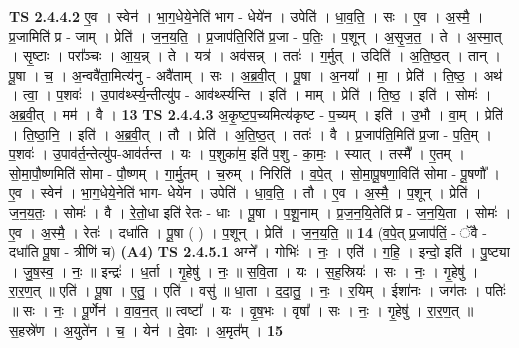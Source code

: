 \documentclass[17pt]{extarticle}
\begin{document}
                  \newline
                                \textbf{ TS 2.4.4.2} \newline
                  ए॒व । स्वेन॑ । भा॒ग॒धेये॒नेति॑ भाग - धेये॑न । उपेति॑ । धा॒व॒ति॒ । सः । ए॒व । अ॒स्मै॒ । प्र॒जामिति॑ प्र - जाम् । प्रेति॑ । ज॒न॒य॒ति॒ । प्र॒जाप॑ति॒रिति॑ प्र॒जा - प॒तिः॒ । प॒शून् । अ॒सृ॒ज॒त॒ । ते । अ॒स्मा॒त् । सृ॒ष्टाः । परा᳚ञ्चः । आ॒य॒न्न् । ते । यत्र॑ । अव॑सन्न् । ततः॑ । ग॒र्मुत् । उदिति॑ । अ॒ति॒ष्ठ॒त् । तान् । पू॒षा । च॒ । अ॒न्ववै॑ता॒मित्य॑नु - अवै॑ताम् । सः । अ॒ब्र॒वी॒त् । पू॒षा । अ॒नया᳚ । मा॒ । प्रेति॑ । ति॒ष्ठ॒ । अथ॑ । त्वा॒ । प॒शवः॑ । उ॒पाव॑र्थ्स्य॒न्तीत्यु॑प - आव॑र्थ्स्यन्ति । इति॑ । माम् । प्रेति॑ । ति॒ष्ठ॒ । इति॑ । सोमः॑ । अ॒ब्र॒वी॒त् । मम॑ । वै । \textbf{  13} \newline
                  \newline
                                \textbf{ TS 2.4.4.3} \newline
                  अ॒कृ॒ष्ट॒प॒च्यमित्य॑कृष्ट - प॒च्यम् । इति॑ । उ॒भौ । वा॒म् । प्रेति॑ । ति॒ष्ठा॒नि॒ । इति॑ । अ॒ब्र॒वी॒त् । तौ । प्रेति॑ । अ॒ति॒ष्ठ॒त् । ततः॑ । वै । प्र॒जाप॑ति॒मिति॑ प्र॒जा - प॒ति॒म् । प॒शवः॑ । उ॒पाव॑र्त॒न्तेत्यु॑प-आव॑र्तन्त । यः । प॒शुका॑म॒ इति॑ प॒शु - का॒मः॒ । स्यात् । तस्मै᳚ । ए॒तम् । सो॒मा॒पौ॒ष्णमिति॑ सोमा - पौ॒ष्णम् । गा॒र्मु॒तम् । च॒रुम् । निरिति॑ । व॒पे॒त् । सो॒मा॒पू॒षणा॒विति॑ सोमा - पू॒षणौ᳚ । ए॒व । स्वेन॑ । भा॒ग॒धेये॒नेति॑ भाग- धेये॑न । उपेति॑ । धा॒व॒ति॒ । तौ । ए॒व । अ॒स्मै॒ । प॒शून् । प्रेति॑ । ज॒न॒य॒तः॒ । सोमः॑ । वै । रे॒तो॒धा इति॑ रेतः - धाः । पू॒षा । प॒शू॒नाम् । प्र॒ज॒न॒यि॒तेति॑ प्र - ज॒न॒यि॒ता । सोमः॑ । ए॒व । अ॒स्मै॒ । रेतः॑ । दधा॑ति । पू॒षा ( ) । प॒शून् । प्रेति॑ । ज॒न॒य॒ति॒ ॥ \textbf{  14} \newline
                  \newline
                      (व॒पे॒त् प्र॒जाप॑तिं॒ - ॅवै - दधा॑ति पू॒षा - त्रीणि॑ च)  \textbf{(A4)} \newline \newline
                                \textbf{ TS 2.4.5.1} \newline
                  अग्ने᳚ । गोभिः॑ । नः॒ । एति॑ । ग॒हि॒ । इन्दो॒ इति॑ । पु॒ष्ट्या । जु॒ष॒स्व॒ । नः॒ ॥ इन्द्रः॑ । ध॒र्ता । गृ॒हेषु॑ । नः॒ ॥ स॒वि॒ता । यः । स॒ह॒स्रियः॑ । सः । नः॒ । गृ॒हेषु॑ । रा॒र॒ण॒त् ॥ एति॑ । पू॒षा । ए॒तु॒ । एति॑ । वसु॑ ॥ धा॒ता । द॒दा॒तु॒ । नः॒ । र॒यिम् । ईशा॑नः । जग॑तः । पतिः॑ ॥ सः । नः॒ । पू॒र्णेन॑ । वा॒व॒न॒त् ॥ त्वष्टा᳚ । यः । वृ॒ष॒भः । वृषा᳚ । सः । नः॒ । गृ॒हेषु॑ । रा॒र॒ण॒त् ॥ स॒हस्रे॑ण । अ॒युते॑न । च॒ । येन॑ । दे॒वाः । अ॒मृत᳚म् । \textbf{  15} \newline
\end{document}
